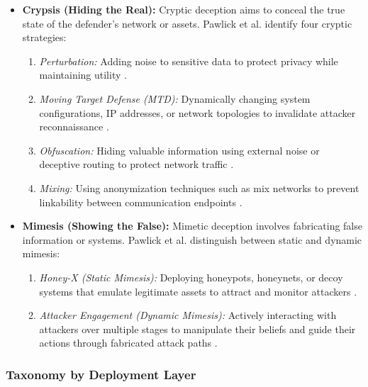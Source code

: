 \begin{itemize}
      \item \textbf{Crypsis (Hiding the Real):} Cryptic deception aims to conceal the true state of the defender's
            network or assets. Pawlick et al. identify four cryptic strategies:
            \begin{enumerate}
                  \item \textit{Perturbation:} Adding noise to sensitive data to protect privacy while maintaining
                        utility \cite{pawlick2019game}.
                  \item \textit{Moving Target Defense (MTD):} Dynamically changing system configurations, IP addresses,
                        or network topologies to invalidate attacker reconnaissance \cite{pawlick2019game}.
                  \item \textit{Obfuscation:} Hiding valuable information using external noise or deceptive routing to
                        protect network traffic \cite{pawlick2019game}.
                  \item \textit{Mixing:} Using anonymization techniques such as mix networks to prevent linkability
                        between communication endpoints \cite{pawlick2019game}.
            \end{enumerate}

      \item \textbf{Mimesis (Showing the False):} Mimetic deception involves fabricating false information or systems.
            Pawlick et al. distinguish between static and dynamic mimesis:
            \begin{enumerate}
                  \item \textit{Honey-X (Static Mimesis):} Deploying honeypots, honeynets, or decoy systems that emulate
                        legitimate assets to attract and monitor attackers \cite{pawlick2019game,han2018deception}.
                  \item \textit{Attacker Engagement (Dynamic Mimesis):} Actively interacting with attackers over multiple
                        stages to manipulate their beliefs and guide their actions through fabricated attack paths \cite{pawlick2019game}.
            \end{enumerate}
\end{itemize}


\subsubsection{Taxonomy by Deployment Layer}

